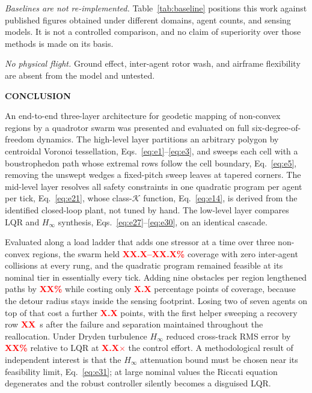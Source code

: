 \documentclass[10pt,letterpaper]{article}
\newcommand{\headingone}[1]{%
    \par\vspace{9pt}%
    {\centering\fontsize{12}{14}\selectfont\bfseries\MakeUppercase{#1}\par}%
    \vspace{4pt}\noindent\ignorespaces}
\newcommand{\val}[1]{\textcolor{red}{\textbf{#1}}}
\begin{document}
\emph{Baselines are not re-implemented.} Table~\ref{tab:baseline} positions this work
against published figures obtained under different domains, agent counts, and sensing
models. It is not a controlled comparison, and no claim of superiority over those methods
is made on its basis.

\emph{No physical flight.} Ground effect, inter-agent rotor wash, and airframe flexibility
are absent from the model and untested.

\headingone{Conclusion}

An end-to-end three-layer architecture for geodetic mapping of non-convex regions by a
quadrotor swarm was presented and evaluated on full six-degree-of-freedom dynamics. The
high-level layer partitions an arbitrary polygon by centroidal Voronoi tessellation,
Eqs.~\eqref{eq:e1}--\eqref{eq:e3}, and sweeps each cell with a boustrophedon path whose extremal rows follow the
cell boundary, Eq.~\eqref{eq:e5}, removing the unswept wedges a fixed-pitch sweep leaves at tapered
corners. The mid-level layer resolves all safety constraints in one quadratic program per
agent per tick, Eq.~\eqref{eq:e21}, whose class-$\mathcal{K}$ function, Eq.~\eqref{eq:e14}, is derived from the
identified closed-loop plant, not tuned by hand. The low-level layer compares LQR and
$H_\infty$ synthesis, Eqs.~\eqref{eq:e27}--\eqref{eq:e30}, on an identical cascade.

Evaluated along a load ladder that adds one stressor at a time over three non-convex
regions, the swarm held \val{XX.X--XX.X\%} coverage with zero inter-agent collisions at every
rung, and the quadratic program remained feasible at its nominal tier in essentially every
tick. Adding nine obstacles per region lengthened paths by \val{XX\%} while costing only
\val{X.X} percentage points of coverage, because the detour radius stays inside the sensing
footprint. Losing two of seven agents on top of that cost a further \val{X.X} points, with
the first helper sweeping a recovery row \val{XX}~s after the failure and separation
maintained throughout the reallocation. Under Dryden turbulence $H_\infty$ reduced
cross-track RMS error by \val{XX\%} relative to LQR at \val{X.X$\times$} the control effort.
A methodological result of independent interest is that the $H_\infty$ attenuation bound must
be chosen near its feasibility limit, Eq.~\eqref{eq:e31}; at large nominal values the Riccati equation
degenerates and the robust controller silently becomes a disguised LQR.
\end{document}
